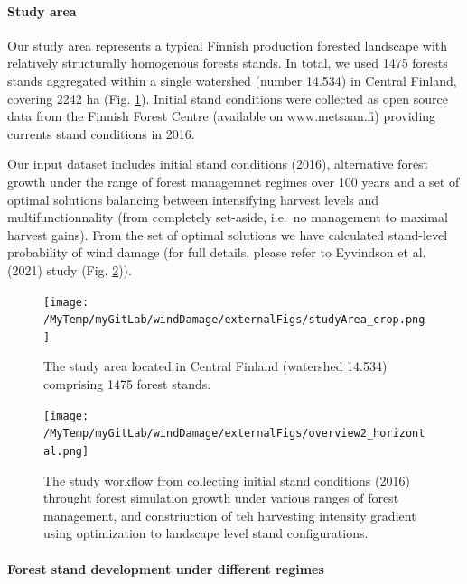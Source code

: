 \documentclass[]{elsarticle} %
\begin{document}
\paragraph{Study area}\label{study-area}

Our study area represents a typical Finnish production forested
landscape with relatively structurally homogenous forests stands. In
total, we used 1475 forests stands aggregated within a single watershed
(number 14.534) in Central Finland, covering 2242 ha (Fig.
\ref{study_area}). Initial stand conditions were collected as open
source data from the Finnish Forest Centre (available on www.metsaan.fi)
providing currents stand conditions in 2016.

Our input dataset includes initial stand conditions (2016), alternative
forest growth under the range of forest managemnet regimes over 100
years and a set of optimal solutions balancing between intensifying
harvest levels and multifunctionnality (from completely set-aside,
i.e.~no management to maximal harvest gains). From the set of optimal
solutions we have calculated stand-level probability of wind damage (for
full details, please refer to Eyvindson et al. (2021) study (Fig.
\ref{workflow})).

\begin{figure}
\centering
\texttt{[image: /MyTemp/myGitLab/windDamage/externalFigs/studyArea\_crop.png]}
\caption{The study area located in Central Finland (watershed 14.534)
comprising 1475 forest stands.\label{study_area}}
\end{figure}

\begin{figure}
\centering
\texttt{[image: /MyTemp/myGitLab/windDamage/externalFigs/overview2\_horizontal.png]}
\caption{The study workflow from collecting initial stand conditions
(2016) throught forest simulation growth under various ranges of forest
management, and constriuction of teh harvesting intensity gradient using
optimization to landscape level stand configurations.\label{workflow}}
\end{figure}

\paragraph{Forest stand development under different
regimes}\label{forest-stand-development-under-different-regimes}
\end{document}
